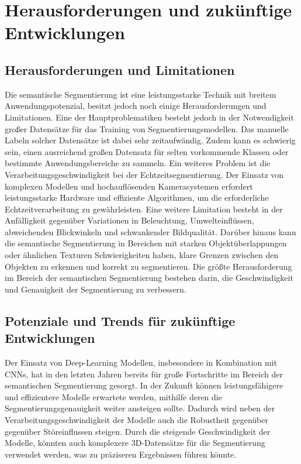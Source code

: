 \chapter{Herausforderungen und zukünftige Entwicklungen}
\section{Herausforderungen und Limitationen}
Die semantische Segmentierung ist eine leistungsstarke Technik mit breitem
Anwendungspotenzial, besitzt jedoch noch einige Herausforderungen und
Limitationen. Eine der Hauptproblematiken besteht jedoch in der Notwendigkeit
großer Datensätze für das Training von Segmentierungsmodellen. Das manuelle
Labeln solcher Datensätze ist dabei sehr zeitaufwändig. Zudem kann es schwierig
sein, einen ausreichend großen Datensatz für selten vorkommende Klassen oder
bestimmte Anwendungsbereiche zu sammeln. Ein weiteres Problem ist die
Verarbeitungsgeschwindigkeit bei der Echtzeitsegmentierung. Der Einsatz von
komplexen Modellen und hochauflösenden Kamerasystemen erfordert leistungsstarke
Hardware und effiziente Algorithmen, um die erforderliche Echtzeitverarbeitung
zu gewährleisten. Eine weitere Limitation besteht in der Anfälligkeit gegenüber
Variationen in Beleuchtung, Umwelteinflüssen, abweichenden Blickwinkeln und
schwankender Bildqualität. Darüber hinaus kann die semantische Segmentierung in
Bereichen mit starken Objektüberlappungen oder ähnlichen Texturen
Schwierigkeiten haben, klare Grenzen zwischen den Objekten zu erkennen und
korrekt zu segmentieren. Die größte Herausforderung im Bereich der semantischen
Segmentierung bestehen darin, die Geschwindigkeit und Genauigkeit der
Segmentierung zu verbessern.

\section{Potenziale und Trends für zukünftige Entwicklungen}

Der Einsatz von Deep-Learning Modellen, insbesondere in Kombination mit CNNs,
hat in den letzten Jahren bereits für große Fortschritte im Bereich der
semantischen Segmentierung gesorgt. In der Zukunft können leistungsfähigere und
effizientere Modelle erwartete werden, mithilfe deren die
Segmentierungsgenauigkeit weiter ansteigen sollte. Dadurch wird neben der
Verarbeitungsgeschwindigkeit der Modelle auch die Robustheit gegenüber
gegenüber Störeinflussen steigen. Durch die steigende Geschwindigkeit der
Modelle, könnten auch komplexere 3D-Datensätze für die Segmentierung verwendet
werden, was zu präziseren Ergebnissen führen könnte.


